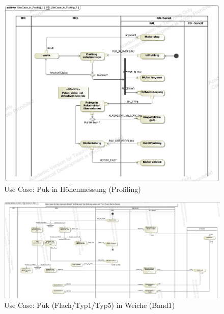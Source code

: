 \documentclass[
   draft=false
  ,paper=a4
  ,twoside=true
  ,fontsize=11pt
  ,headsepline
  ,DIV11
  ,parskip=full+
]{scrartcl} %
\begin{document}
\begin{figure}[H]
\begin{addmargin*}[0cm]{-0.15\textwidth}
  	\centering
    \includegraphics [width=1.3\textwidth, scale=1]{./IMG/UseCaseInProfing1.png}
    \caption[short Name]{Use Case: Puk in Höhenmessung (Profiling)}
    	\label{fig:uc2profiling}
\end{addmargin*}
\end{figure}

\begin{figure}[H]
\begin{addmargin*}[-2.25cm]{0.1\textwidth}

  	\centering
    \includegraphics [width=1.3\textwidth]{./IMG/UseCaseInSlide11.jpg}
    \caption[short Name]{Use Case: Puk (Flach/Typ1/Typ5) in Weiche (Band1)}
    	\label{fig:uc3slide}
\end{addmargin*}
\end{figure}
\end{document}
